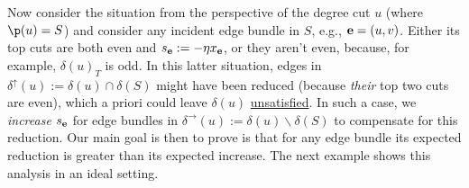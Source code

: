 Now consider the situation from the perspective of the degree cut $u$ (where $\p(u)=S$) and consider any incident edge bundle in $S$, e.g., ${\bf e} = (u,v)$. Either its top cuts are both even and $s_{\bf e} := - \eta x_{\bf e}$, or they aren't even, because, for example, $\delta(u)_T$ is odd. In this latter situation,  edges in   $\delta^\uparrow(u):= \delta(u)\cap \delta(S)$ might have been reduced (because {\em their} top two cuts are even), which a priori could leave $\delta(u)$ \hyperlink{tar:satisfy}{unsatisfied}. In such a case, we {\em increase} $s_{\bf e}$ for edge bundles in $ \delta^\rightarrow(u):= \delta (u) \smallsetminus \delta(S)$ to compensate for this reduction.  Our main goal is then to prove is that for any edge bundle its expected reduction is greater than its expected increase.
  The next example shows this analysis in an ideal setting. 

 
 
